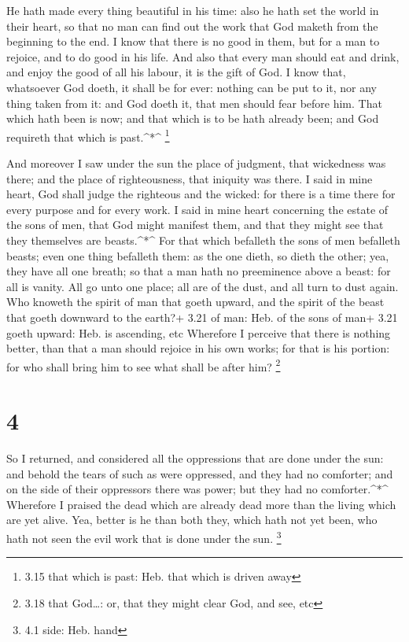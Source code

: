  He hath made every thing beautiful in his time: also he
hath set the world in their heart, so that no man can find out the work
that God maketh from the beginning to the end.  I know that
there is no good in them, but for a man to rejoice, and to do good in
his life.  And also that every man should eat and drink,
and enjoy the good of all his labour, it is the gift of God.
 I know that, whatsoever God doeth, it shall be for ever:
nothing can be put to it, nor any thing taken from it: and God doeth it,
that men should fear before him.  That which hath been is
now; and that which is to be hath already been; and God requireth that
which is past.\^{}*\^{} \footnote{3.15 that which is past: Heb. that
  which is driven away}

 And moreover I saw under the sun the place of judgment,
that wickedness was there; and the place of righteousness, that iniquity
was there.  I said in mine heart, God shall judge the
righteous and the wicked: for there is a time there for every purpose
and for every work.  I said in mine heart concerning the
estate of the sons of men, that God might manifest them, and that they
might see that they themselves are beasts.\^{}*\^{}  For
that which befalleth the sons of men befalleth beasts; even one thing
befalleth them: as the one dieth, so dieth the other; yea, they have all
one breath; so that a man hath no preeminence above a beast: for all is
vanity.  All go unto one place; all are of the dust, and
all turn to dust again.  Who knoweth the spirit of man that
goeth upward, and the spirit of the beast that goeth downward to the
earth?+ 3.21 of man: Heb. of the sons of man+ 3.21 goeth upward: Heb. is
ascending, etc  Wherefore I perceive that there is nothing
better, than that a man should rejoice in his own works; for that is his
portion: for who shall bring him to see what shall be after him?
\footnote{3.18 that God\ldots: or, that they might clear God, and see,
  etc}

\hypertarget{section-3}{%
\section{4}\label{section-3}}

 So I returned, and considered all the oppressions that are
done under the sun: and behold the tears of such as were oppressed, and
they had no comforter; and on the side of their oppressors there was
power; but they had no comforter.\^{}*\^{}  Wherefore I
praised the dead which are already dead more than the living which are
yet alive.  Yea, better is he than both they, which hath not
yet been, who hath not seen the evil work that is done under the sun.
\footnote{4.1 side: Heb. hand}

